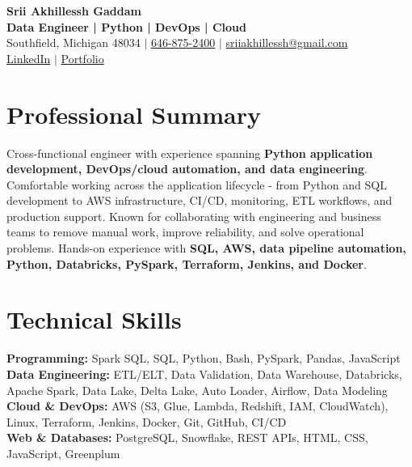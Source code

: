 \documentclass[letterpaper,10pt]{article}
\begin{document}
\fontsize{9.35pt}{10.45pt}\selectfont

\begin{center}
    {\LARGE \textbf{Srii Akhillessh Gaddam}} \\[-1pt]
    \textbf{Data Engineer | Python | DevOps | Cloud} \\[2pt]
    Southfield, Michigan 48034 $|$
    \href{tel:6468752400}{646-875-2400} $|$
    \href{mailto:sriiakhillessh@gmail.com}{sriiakhillessh@gmail.com} \\[1pt]
    \href{https://www.linkedin.com/in/srii-akhiilessh-gaddam-b48668191/}{LinkedIn} $|$
    \href{https://sriiakhillesshg.github.io/portfolio/}{Portfolio}
\end{center}
\vspace{-8pt}

\section{Professional Summary}
\small{Cross-functional engineer with experience spanning \textbf{Python application development, DevOps/cloud automation, and data engineering}. Comfortable working across the application lifecycle - from Python and SQL development to AWS infrastructure, CI/CD, monitoring, ETL workflows, and production support. Known for collaborating with engineering and business teams to remove manual work, improve reliability, and solve operational problems. Hands-on experience with \textbf{SQL, AWS, data pipeline automation, Python, Databricks, PySpark, Terraform, Jenkins, and Docker}.}

\section{Technical Skills}
\small{
\textbf{Programming:} Spark SQL, SQL, Python, Bash, PySpark, Pandas, JavaScript \\
\textbf{Data Engineering:} ETL/ELT, Data Validation, Data Warehouse, Databricks, Apache Spark, Data Lake, Delta Lake, Auto Loader, Airflow, Data Modeling \\
\textbf{Cloud \& DevOps:} AWS (S3, Glue, Lambda, Redshift, IAM, CloudWatch), Linux, Terraform, Jenkins, Docker, Git, GitHub, CI/CD \\
\textbf{Web \& Databases:} PostgreSQL, Snowflake, REST APIs, HTML, CSS, JavaScript, Greenplum
}
\end{document}
